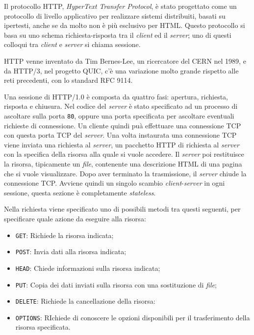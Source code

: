 \documentclass{article}
\numberwithin{equation}{subsection}
\begin{document}
Il protocollo \textcolor{NavyBlue}{HTTP}, \textit{HyperText Transfer Protocol}, è stato progettato come un protocollo di livello applicativo per realizzare sistemi distribuiti, basati su 
ipertesti, anche se da molto non è più esclusivo per \textcolor{Peach}{HTML}. Questo protocollo si basa su uno schema richiesta-risposta tra il \textit{client} ed il \textit{server}; uno di questi colloqui tra \textit{client} e \textit{server} si chiama sessione. 

\textcolor{NavyBlue}{HTTP} venne inventato da Tim Bernes-Lee, un ricercatore del CERN nel 1989, e da \textcolor{NavyBlue}{HTTP}/3, nel progetto QUIC, c'è una variazione molto grande rispetto alle reti 
precedenti, con lo standard RFC 9114. 


Una sessione di \textcolor{NavyBlue}{HTTP}/1.0 è composta da quattro fasi: apertura, richiesta, risposta e chiusura. Nel codice del \textit{server} è stato specificato ad un processo di ascoltare 
sulla porta \texttt{80}, oppure una porta specificata per ascoltare eventuali richieste di connessione. Un cliente quindi puà effettuare una connessione \textcolor{Bittersweet}{TCP} con questa 
porta \textcolor{Bittersweet}{TCP} del \textit{server}. Una volta instaurata una connessione \textcolor{Bittersweet}{TCP} viene inviata una richiesta al \textit{server}, un pacchetto \textcolor{NavyBlue}{HTTP} di richiesta al \textit{server} con la specifica della 
risorsa alla quale si vuole accedere. Il \textit{server} poi restituisce la risorsa, tipicamente un \textit{file}, contenente una descrizione \textcolor{Peach}{HTML} di una pagina che si vuole visualizzare. 
Dopo aver terminato la trasmissione, il \textit{server} chiude la connessione \textcolor{Bittersweet}{TCP}. 
Avviene quindi un singolo scambio \textit{client}-\textit{server} in ogni sessione, questa sezione è completamente \textit{stateless}. 

Nella richiesta viene specificato uno di possibili metodi tra questi seguenti, per specificare quale azione da eseguire alla risorsa:
\begin{itemize}
    \item \verb|GET|: Richiede la risorsa indicata;
    \item \verb|POST|: Invia dati alla risorsa indicata;
    \item \verb|HEAD|: Chiede informazioni sulla risorsa indicata;
    \item \verb|PUT|: Copia dei dati inviati sulla risorsa con una sostituzione di \textit{file};
    \item \verb|DELETE|: Richiede la cancellazione della risorsa:
    \item \verb|OPTIONS|: RIchiede di conoscere le opzioni disponibili per il trasferimento della risorsa specificata. 
\end{itemize}
\end{document}
